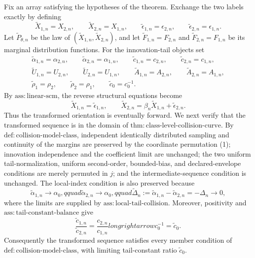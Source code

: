 Fix an array satisfying the hypotheses of the theorem.  Exchange the two labels exactly by defining
\[
\widetilde X_{1,n}=X_{2,n},\qquad
\widetilde X_{2,n}=X_{1,n},\qquad
\widetilde\epsilon_{1,n}=\epsilon_{2,n},\qquad
\widetilde\epsilon_{2,n}=\epsilon_{1,n}.
\tag{1}
\]
Let \(\widetilde P_{\theta,n}\) be the law of \((\widetilde X_{1,n},\widetilde X_{2,n})\), and let \(\widetilde F_{1,n}=F_{2,n}\) and \(\widetilde F_{2,n}=F_{1,n}\) be its marginal distribution functions.  For the innovation-tail objects set
\[
\begin{gathered}
\widetilde\alpha_{1,n}=\alpha_{2,n},\qquad
\widetilde\alpha_{2,n}=\alpha_{1,n},\qquad
\widetilde c_{1,n}=c_{2,n},\qquad
\widetilde c_{2,n}=c_{1,n},\\
\widetilde U_{1,n}=U_{2,n},\qquad
\widetilde U_{2,n}=U_{1,n},\qquad
\widetilde A_{1,n}=A_{2,n},\qquad
\widetilde A_{2,n}=A_{1,n},\\
\widetilde\rho_1=\rho_2,\qquad
\widetilde\rho_2=\rho_1,
\qquad
\widetilde c_0=c_0^{-1}.
\end{gathered}
\tag{2}
\]
By \(\mathrm{ass{:}linear\text{-}scm}\), the reverse structural equations become
\[
\widetilde X_{1,n}=\widetilde\epsilon_{1,n},
\qquad
\widetilde X_{2,n}=\beta_n\widetilde X_{1,n}+\widetilde\epsilon_{2,n}.
\tag{3}
\]
Thus the transformed orientation is eventually forward.  We next verify that the transformed sequence is in the domain of \(\mathrm{thm{:}class\text{-}level\text{-}collision\text{-}curve}\).  By \(\mathrm{def{:}collision\text{-}model\text{-}class}\), independent identically distributed sampling and continuity of the margins are preserved by the coordinate permutation (1); innovation independence and the coefficient limit are unchanged; the two uniform tail-normalization, uniform second-order, bounded-bias, and declared-envelope conditions are merely permuted in \(j\); and the intermediate-sequence condition is unchanged.  The local-index condition is also preserved because
\[
\widetilde\alpha_{1,n}\to\alpha_0,qquad
\widetilde\alpha_{2,n}\to\alpha_0,qquad
\widetilde\Delta_n
:=\widetilde\alpha_{1,n}-\widetilde\alpha_{2,n}
=-\Delta_n\to0,
\tag{4}
\]
where the limits are supplied by \(\mathrm{ass{:}local\text{-}tail\text{-}collision}\).  Moreover, positivity and \(\mathrm{ass{:}tail\text{-}constant\text{-}balance}\) give
\[
\frac{\widetilde c_{1,n}}{\widetilde c_{2,n}}
=\frac{c_{2,n}}{c_{1,n}}longrightarrow c_0^{-1}=\widetilde c_0.
\tag{5}
\]
Consequently the transformed sequence satisfies every member condition of \(\mathrm{def{:}collision\text{-}model\text{-}class}\), with limiting tail-constant ratio \(\widetilde c_0\).


